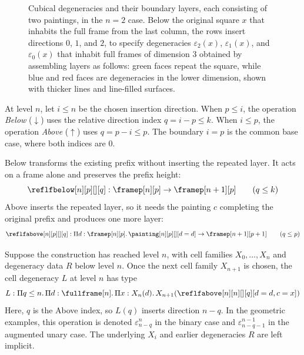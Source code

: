 \documentclass[a4paper,UKenglish,cleveref,autoref]{lipics-v2021}
\renewcommand{\d}{d}
\begin{document}
\begin{figure}[tbp]
\begin{tabularx}{\linewidth}{@{}YYYYYY@{}}
    \cubePicture{\cubeDegenLastLayerFirst} & \cubePicture{\cubeDegenLastLayerSecond}                   &
    \cubePicture{\cubeLastLayerThird}      &
    \cubePicture{\cubeDegenLastLayerFirst\cubeDegenLastLayerSecond\cubeLastLayerThird}                                                                  \\
    \bottomrule
  \end{tabularx}
  \endgroup
  \caption{Cubical degeneracies and their boundary layers, each consisting of two paintings, in the $n=2$ case. Below the original square $x$ that inhabits the full frame from the last column, the rows insert directions $0$, $1$, and $2$, to specify degeneracies $\varepsilon_2(x)$, $\varepsilon_1(x)$, and $\varepsilon_0(x)$ that inhabit full frames of dimension $3$ obtained by assembling layers as follows: green faces repeat the square, while blue and red faces are degeneracies in the lower dimension, shown with thicker lines and line-filled surfaces.}
  \label{fig:degeneracy-layers}
\end{figure}

At level $n$, let $i\leq n$ be the chosen insertion direction. When $p\leq i$, the operation \emph{Below} ($\downarrow$) uses the relative direction index $q=i-p\leq k$. When $i\leq p$, the operation \emph{Above} ($\uparrow$) uses $q=p-i\leq p$. The boundary $i=p$ is the common base case, where both indices are $0$.

Below transforms the existing prefix without inserting the repeated layer. It acts on a frame alone and preserves the prefix height:
\begin{equation*}
  \reflfbelow[n][p][][q]:\framep[n][p]\rightarrow\framep[n+1][p]
  \qquad(q\leq k)
\end{equation*}
Above inserts the repeated layer, so it needs the painting $c$ completing the original prefix and produces one more layer:
\begin{equation*}
  \reflfabove[n][p][][q]:\Pi d:\framep[n][p].\,
  \painting[n][p][][d=\d]\rightarrow\framep[n+1][p+1]
  \qquad(q\leq p)
\end{equation*}

Suppose the construction has reached level $n$, with cell families $X_0,\ldots,X_n$ and degeneracy data $R$ below level $n$. Once the next cell family $X_{n+1}$ is chosen, the cell degeneracy $L$ at level $n$ has type
\begin{equation*}
  L:\Pi q\leq n.\,\Pi d:\fullframe[n].\,\Pi x:X_n(d).\,
  X_{n+1}(\reflfabove[n][n][][q][d=\d,c=x])
\end{equation*}
Here, $q$ is the Above index, so $L(q)$ inserts direction $n-q$. In the geometric examples, this operation is denoted $\varepsilon^n_{n-q}$ in the binary case and $\varepsilon^{n-1}_{n-q-1}$ in the augmented unary case. The underlying $X_i$ and earlier degeneracies $R$ are left implicit.
\end{document}
